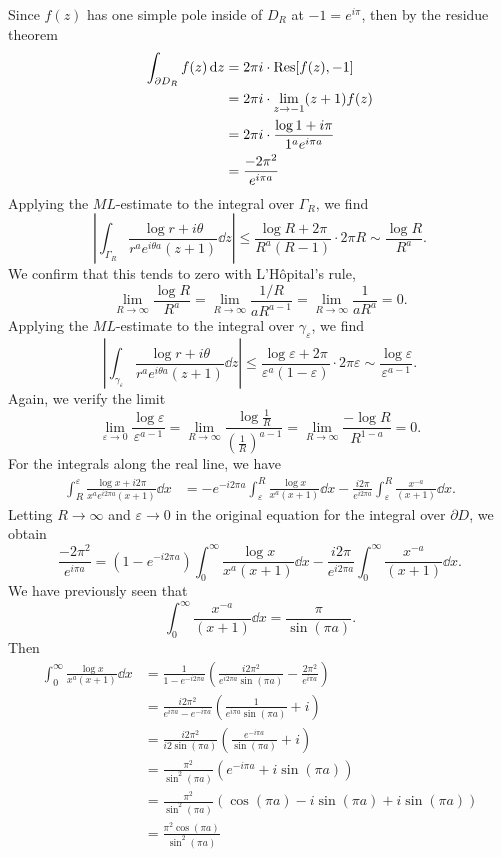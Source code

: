 \documentclass[12pt]{article}
\theoremstyle{definition}
\newcommand{\eps}{\varepsilon}
\newcommand{\pfrac}[2]{\left(\frac{#1}{#2}\right)}
\newcommand{\bd}{\partial}
\begin{document}
Since $f(z)$ has one simple pole inside of $D_R$ at $-1 = e^{i\pi}$, then by the residue theorem
\begin{align*}
    \int_{\bd D_R} f(z) \dd{z}
        &= 2\pi i \cdot \Res[f(z), -1] \\
        &= 2\pi i \cdot \lim_{z \to -1} (z + 1) f(z) \\
        &= 2\pi i \cdot \frac{\log 1 + i\pi}{1^a e^{i\pi a}} \\
        &= \frac{-2\pi^2}{e^{i\pi a}}
\end{align*}
Applying the $ML$-estimate to the integral over $\Gamma_R$, we find
\[
    \left|\int_{\Gamma_R} \frac{\log r + i\theta}{r^a e^{i\theta a}(z + 1)} \dd{z}\right|
        \leq \frac{\log R + 2\pi}{R^a(R - 1)} \cdot 2\pi R
        \sim \frac{\log R}{R^a}.
\]
We confirm that this tends to zero with L'H\^opital's rule, 
\[
    \lim_{R \to \infty} \frac{\log R}{R^a}
        = \lim_{R \to \infty} \frac{1/R}{aR^{a-1}}
        = \lim_{R \to \infty} \frac{1}{aR^a}
        = 0.
\]
Applying the $ML$-estimate to the integral over $\gamma_\eps$, we find
\[
    \left|\int_{\gamma_\eps} \frac{\log r + i\theta}{r^a e^{i\theta a}(z + 1)} \dd{z}\right|
        \leq \frac{\log \eps + 2\pi}{\eps^a(1 - \eps)} \cdot 2\pi \eps
        \sim \frac{\log \eps}{\eps^{a-1}}.
\]
Again, we verify the limit
\[
    \lim_{\eps \to 0} \frac{\log \eps}{\eps^{a-1}}
        = \lim_{R \to \infty} \frac{\log \frac{1}{R}}{\pfrac{1}{R}^{a-1}}
        = \lim_{R \to \infty} \frac{-\log R}{R^{1-a}}
        = 0.
\]
For the integrals along the real line, we have
\begin{align*}
    \int_{R}^{\eps} \frac{\log x + i2\pi}{x^ae^{i2\pi a}(x + 1)} \dd{x}
        &= -e^{-i2\pi a} \int_{\eps}^{R} \frac{\log x}{x^a(x + 1)} \dd{x} - \frac{i2\pi}{e^{i2\pi a}} \int_{\eps}^{R} \frac{x^{-a}}{(x + 1)} \dd{x}.
\end{align*}
Letting $R \to \infty$ and $\eps \to 0$ in the original equation for the integral over $\bd D$, we obtain
\[
    \frac{-2\pi^2}{e^{i\pi a}}
        = (1 - e^{-i2\pi a}) \int_{0}^{\infty} \frac{\log x}{x^a(x + 1)} \dd{x} - \frac{i2\pi}{e^{i2\pi a}} \int_{0}^{\infty} \frac{x^{-a}}{(x + 1)} \dd{x}.
\]
We have previously seen that
\[
    \int_{0}^{\infty} \frac{x^{-a}}{(x + 1)} \dd{x} = \frac{\pi}{\sin(\pi a)}.
\]
Then
\begin{align*}
    \int_{0}^{\infty} \frac{\log x}{x^a(x + 1)} \dd{x}
        &= \frac{1}{1 - e^{-i2\pi a}}\left(\frac{i2\pi^2}{e^{i2\pi a}\sin(\pi a)} - \frac{2\pi^2}{e^{i\pi a}}\right) \\
        &=  \frac{i2\pi^2}{e^{i\pi a} - e^{-i\pi a}}\left(\frac{1}{e^{i\pi a}\sin(\pi a)} + i\right) \\
        &=  \frac{i2\pi^2}{i2\sin(\pi a)}\left(\frac{e^{-i\pi a}}{\sin(\pi a)} + i\right) \\
        &=  \frac{\pi^2}{\sin^2(\pi a)}\left(e^{-i\pi a} + i\sin(\pi a)\right) \\
        &=  \frac{\pi^2}{\sin^2(\pi a)} \left(\cos(\pi a) - i\sin(\pi a) + i\sin(\pi a)\right) \\
        &=  \frac{\pi^2\cos(\pi a)}{\sin^2(\pi a)}
\end{align*}
\end{document}

